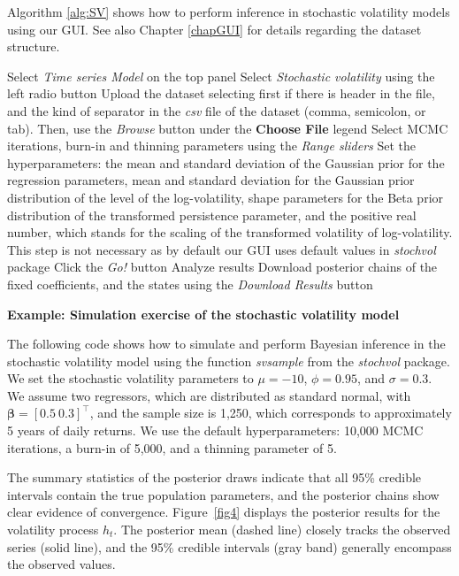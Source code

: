Algorithm \ref{alg:SV} shows how to perform inference in stochastic volatility models using our GUI. See also Chapter \ref{chapGUI} for details regarding the dataset structure. 

\begin{algorithm}[h!]
	\caption{Stochastic volatility models}\label{alg:SV}
	\begin{algorithmic}[1]  		 			
		\State Select \textit{Time series Model} on the top panel
		\State Select \textit{Stochastic volatility} using the left radio button
		\State Upload the dataset selecting first if there is header in the file, and the kind of separator in the \textit{csv} file of the dataset (comma, semicolon, or tab). Then, use the \textit{Browse} button under the \textbf{Choose File} legend
		\State Select MCMC iterations, burn-in and thinning parameters using the \textit{Range sliders}
		\State Set the hyperparameters: the mean and standard deviation of the Gaussian prior for the regression parameters, mean and standard deviation for the Gaussian prior distribution of the level of the log-volatility, shape parameters for the Beta prior distribution of the transformed persistence parameter, and the positive real number, which stands for the scaling of the transformed volatility of log-volatility. This step is not necessary as by default our GUI uses default values in \textit{stochvol} package
		\State Click the \textit{Go!} button
		\State Analyze results
		\State Download posterior chains of the fixed coefficients, and the states using the \textit{Download Results} button
	\end{algorithmic} 
\end{algorithm}

\textbf{Example: Simulation exercise of the stochastic volatility model}

The following code shows how to simulate and perform Bayesian inference in the stochastic volatility model using the function \textit{svsample} from the \textit{stochvol} package. We set the stochastic volatility parameters to $\mu = -10$, $\phi = 0.95$, and $\sigma = 0.3$. We assume two regressors, which are distributed as standard normal, with $\bm{\beta} = [0.5 \ 0.3]^{\top}$, and the sample size is 1,250, which corresponds to approximately 5 years of daily returns. We use the default hyperparameters: 10,000 MCMC iterations, a burn-in of 5,000, and a thinning parameter of 5.

The summary statistics of the posterior draws indicate that all 95\% credible intervals contain the true population parameters, and the posterior chains show clear evidence of convergence. Figure~\ref{fig4} displays the posterior results for the volatility process $h_t$. The posterior mean (dashed line) closely tracks the observed series (solid line), and the 95\% credible intervals (gray band) generally encompass the observed values.

